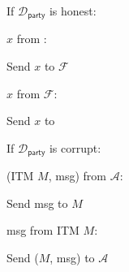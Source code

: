 \begin{bbox}[title={$\mathcal{D}_\mathsf{party}$}]

If $\mathcal{D}_\mathsf{party}$ is honest:

	\quad \OnInput $x$ from \Env:
	
		\qquad Send $x$ to $\mathcal{F}$
		
	\quad \OnInput $x$ from $\mathcal{F}$:
	
		\qquad Send $x$ to \Env
	
If $\mathcal{D}_\mathsf{party}$ is corrupt:

	\quad \OnInput (ITM $M$, \textsf{msg}) from $\mathcal{A}$:

		\qquad Send \textsf{msg} to $M$
		
	\quad \OnInput \textsf{msg} from ITM $M$:
	
		\qquad Send ($M$, \textsf{msg}) to $\mathcal{A}$
\end{bbox}